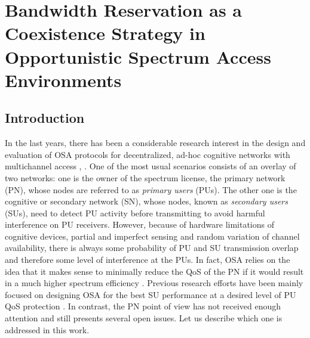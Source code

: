 \graphicspath{ {img/BR/} }
\chapter[Bandwidth Reservation as a Coexistence Strategy in Opportunistic Spectrum Access Environments][Bandwidth Reservation in OSA]{Bandwidth Reservation as a Coexistence Strategy in Opportunistic Spectrum Access Environments}\label{BR_chap}
\section{Introduction}\label{sec:Introduction}
In the last years, there has been a considerable research interest in the design and evaluation of OSA protocols for decentralized, ad-hoc cognitive networks with multichannel access \cite{ref:SurveyMACs},  \cite{ref:comparativaMAC}.
One of the most usual scenarios consists of an overlay of two networks: one is the owner of the spectrum license, the primary network (PN), whose nodes are referred to as \textit{primary users} (PUs). The other one is the cognitive or secondary network (SN), whose nodes, known as \textit{secondary users} (SUs), need to detect PU activity before transmitting to avoid harmful interference on PU receivers.
However, because of hardware limitations of cognitive devices, partial and imperfect sensing and random variation of channel availability, there is always some probability of PU and SU transmission overlap and therefore some level of interference at the PUs.
In fact, OSA relies on the idea that it makes sense to minimally reduce the QoS of the PN if it would result in a much higher spectrum efficiency \cite{ref:comparativaMAC}.
Previous research efforts have been mainly focused on designing OSA for the best SU performance at a desired level of PU QoS protection \cite{ref:SurveyMACs}. In contrast, the PN point of view has not received enough attention and still presents several open issues. Let us describe which one is addressed in this work. 

